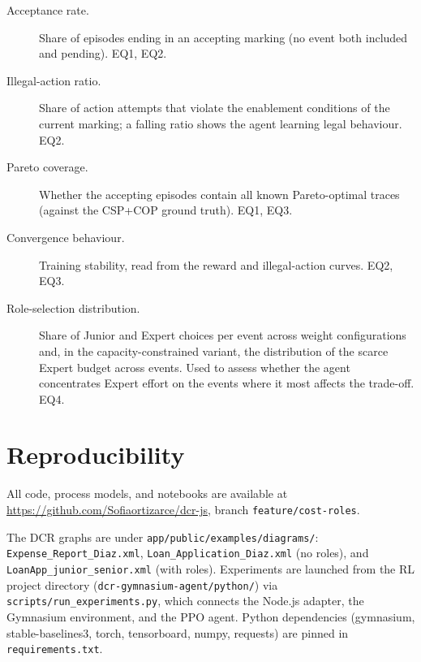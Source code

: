 \begin{description}
    \item[Acceptance rate.] Share of episodes ending in an accepting
    marking (no event both included and pending). EQ1, EQ2.

    \item[Illegal-action ratio.] Share of action attempts that violate
    the enablement conditions of the current marking; a falling ratio
    shows the agent learning legal behaviour. EQ2.

    \item[Pareto coverage.] Whether the accepting episodes contain all
    known Pareto-optimal traces (against the CSP+COP ground truth).
    EQ1, EQ3.

    \item[Convergence behaviour.] Training stability, read from the
    reward and illegal-action curves. EQ2, EQ3.

    \item[Role-selection distribution.] Share of Junior and Expert
    choices per event across weight configurations and, in the
    capacity-constrained variant, the distribution of the scarce Expert
    budget across events. Used to assess whether the agent concentrates
    Expert effort on the events where it most affects the trade-off.
    EQ4.
\end{description}

\section{Reproducibility}
\label{sec:reproducibility}

All code, process models, and notebooks are available at
\url{https://github.com/Sofiaortizarce/dcr-js}, branch
\texttt{feature/cost-roles}.

The \ac{DCR} graphs are under \texttt{app/public/examples/diagrams/}:
\texttt{Expense\_Report\_Diaz.xml}, \texttt{Loan\_Application\_Diaz.xml}
(no roles), and \texttt{LoanApp\_junior\_senior.xml} (with roles).
Experiments are launched from the RL project directory
(\texttt{dcr-gymnasium-agent/python/}) via
\texttt{scripts/run\_experiments.py}, which connects the Node.js
adapter, the Gymnasium environment, and the \ac{PPO} agent. Python
dependencies (gymnasium, stable-baselines3, torch,
tensorboard, numpy, requests) are pinned in \texttt{requirements.txt}.

